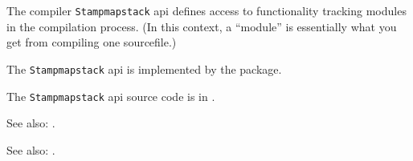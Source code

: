 
The compiler {\tt Stampmapstack} api defines access to functionality tracking modules 
in the compilation process.    (In this context, a ``module'' is essentially what you get from 
compiling one sourcefile.)

The {\tt Stampmapstack} api is implemented by the  package.

The {\tt Stampmapstack} api source code is in .

See also:  .

See also:  .

